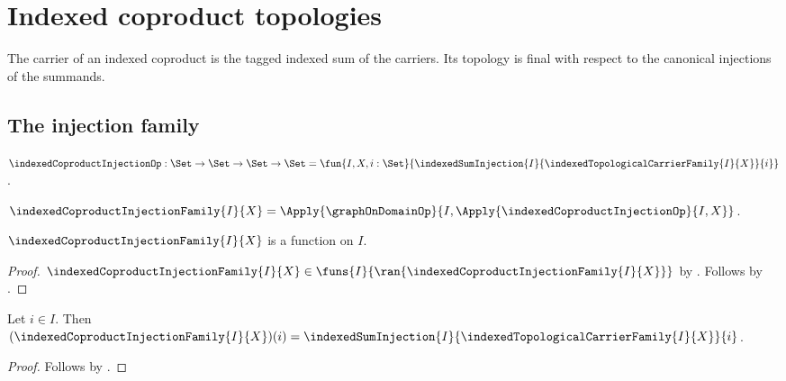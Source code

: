 \section{Indexed coproduct topologies}




The carrier of an indexed coproduct is the tagged indexed sum of the
carriers.  Its topology is final with respect to the canonical injections of
the summands.

\subsection{The injection family}

\begin{definition}\label{indexed_coproduct_injection_op}
    $\indexedCoproductInjectionOp:\Set\to\Set\to\Set\to\Set
        =\fun{I,X,i:\Set}{
            \indexedSumInjection{I}{
                \indexedTopologicalCarrierFamily{I}{X}}{i}}$.
\end{definition}

\begin{definition}\label{indexed_coproduct_injection_family}
    $\indexedCoproductInjectionFamily{I}{X}
        =\Apply{\graphOnDomainOp}{
            I,\Apply{\indexedCoproductInjectionOp}{I,X}}$.
\end{definition}

\begin{proposition}\label{indexed_coproduct_injection_family_type}
    $\indexedCoproductInjectionFamily{I}{X}$ is a function on $I$.
\end{proposition}
\begin{proof}
    $\indexedCoproductInjectionFamily{I}{X}\in
        \funs{I}{\ran{\indexedCoproductInjectionFamily{I}{X}}}$ by
        .
    Follows by .
\end{proof}

\begin{proposition}\label{indexed_coproduct_injection_family_apply}
    Let $i\in I$.
    Then $(\indexedCoproductInjectionFamily{I}{X})(i)
        =\indexedSumInjection{I}{
            \indexedTopologicalCarrierFamily{I}{X}}{i}$.
\end{proposition}
\begin{proof}
    Follows by
        .
\end{proof}

